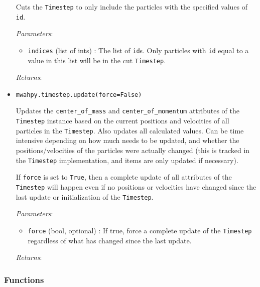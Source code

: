 \documentclass{article}
\begin{document}
\begin{itemize}
Cuts the \verb!Timestep! to only include the particles with the specified values of \verb!id!.

\textit{Parameters}: \begin{itemize}

\item \verb!indices! (list of ints) : The list of \verb!id!s. Only particles with \verb!id! equal to a value in this list will be in the cut \verb!Timestep!.

\end{itemize}

\textit{Returns}: 



\item \verb!mwahpy.timestep.update(force=False)!

Updates the \verb!center_of_mass! and \verb!center_of_momentum! attributes of the \verb!Timestep! instance based on the current positions and velocities of all particles in the \verb!Timestep!. Also updates all calculated values. Can be time intensive depending on how much needs to be updated, and whether the positions/velocities of the particles were actually changed (this is tracked in the \verb!Timestep! implementation, and items are only updated if necessary).

If \verb!force! is set to \verb!True!, then a complete update of all attributes of the \verb!Timestep! will happen even if no positions or velocities have changed since the last update or initialization of the \verb!Timestep!.

\textit{Parameters}: \begin{itemize}

\item \verb!force! (bool, optional) : If true, force a complete update of the \verb!Timestep! regardless of what has changed since the last update.

\end{itemize}

\textit{Returns}:



\end{itemize}

\subsubsection{Functions}
\end{document}
